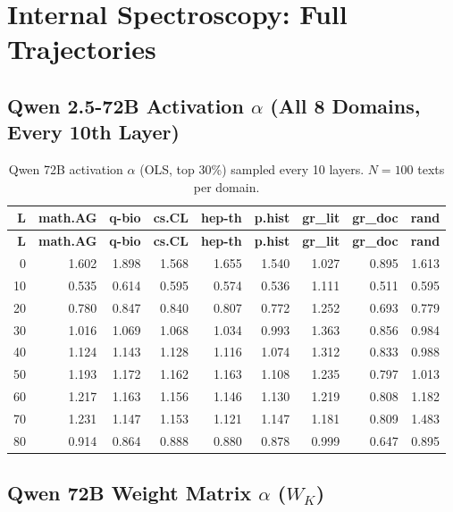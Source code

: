 \documentclass[11pt,letterpaper]{article}
\newcommand{\al}{\alpha}
\begin{document}
\section{Internal Spectroscopy: Full Trajectories}
\label{sec:trajectories_full}

\subsection{Qwen 2.5-72B Activation $\al$ (All 8 Domains, Every 10th Layer)}

\begin{longtable}{rrrrrrrrr}
\caption{Qwen 72B activation $\al$ (OLS, top 30\%) sampled every
10 layers.  $N = 100$ texts per domain.} \\
\toprule
\textbf{L} & \textbf{math.AG} & \textbf{q-bio} & \textbf{cs.CL} &
\textbf{hep-th} & \textbf{p.hist} & \textbf{gr\_lit} &
\textbf{gr\_doc} & \textbf{rand} \\
\midrule
\endfirsthead
\toprule
\textbf{L} & \textbf{math.AG} & \textbf{q-bio} & \textbf{cs.CL} &
\textbf{hep-th} & \textbf{p.hist} & \textbf{gr\_lit} &
\textbf{gr\_doc} & \textbf{rand} \\
\midrule
\endhead
0 & 1.602 & 1.898 & 1.568 & 1.655 & 1.540 & 1.027 & 0.895 & 1.613 \\
10 & 0.535 & 0.614 & 0.595 & 0.574 & 0.536 & 1.111 & 0.511 & 0.595 \\
20 & 0.780 & 0.847 & 0.840 & 0.807 & 0.772 & 1.252 & 0.693 & 0.779 \\
30 & 1.016 & 1.069 & 1.068 & 1.034 & 0.993 & 1.363 & 0.856 & 0.984 \\
40 & 1.124 & 1.143 & 1.128 & 1.116 & 1.074 & 1.312 & 0.833 & 0.988 \\
50 & 1.193 & 1.172 & 1.162 & 1.163 & 1.108 & 1.235 & 0.797 & 1.013 \\
60 & 1.217 & 1.163 & 1.156 & 1.146 & 1.130 & 1.219 & 0.808 & 1.182 \\
70 & 1.231 & 1.147 & 1.153 & 1.121 & 1.147 & 1.181 & 0.809 & 1.483 \\
80 & 0.914 & 0.864 & 0.888 & 0.880 & 0.878 & 0.999 & 0.647 & 0.895 \\
\bottomrule
\end{longtable}

\subsection{Qwen 72B Weight Matrix $\al$ ($W_K$)}
\end{document}
